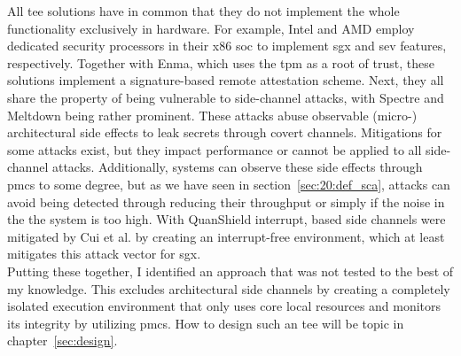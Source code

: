 All \gls{tee} solutions have in common that they do not implement the whole
functionality exclusively in hardware. For example, Intel and AMD employ
dedicated security processors in their x86 \gls{soc} to implement \gls{sgx} and
\gls{sev} features, respectively. Together with Enma, which uses the \gls{tpm}
as a root of trust, these solutions implement a signature-based remote
attestation scheme. Next, they all share the property of being vulnerable to
side-channel attacks, with Spectre and Meltdown being rather prominent. These
attacks abuse observable (micro-) architectural side effects to leak secrets
through covert channels. Mitigations for some attacks exist, but they impact
performance or cannot be applied to all side-channel attacks. Additionally,
systems can observe these side effects through \glspl{pmc} to some degree, but
as we have seen in section~\ref{sec:20:def_sca}, attacks can avoid being
detected through reducing their throughput or simply if the noise in the the
system is too high. With QuanShield interrupt, based side channels were
mitigated by Cui et al. by creating an interrupt-free environment, which at
least mitigates this attack vector for \gls{sgx}.\\

Putting these together, I identified an approach that was not tested to the best
of my knowledge. This excludes architectural side channels by creating a
completely isolated execution environment that only uses core local resources
and monitors its integrity by utilizing \glspl{pmc}. How to design such an
\gls{tee} will be topic in chapter~\ref{sec:design}.


\cleardoublepage


